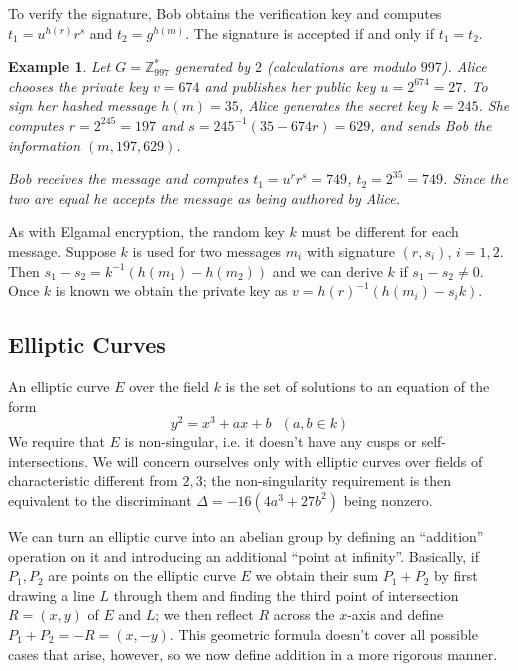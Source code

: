 \documentclass[a4paper,12pt]{article}
\newtheorem*{example}{Example}
\begin{document}
To verify the signature, Bob obtains the verification key and computes $t_1 = u^{h(r)} r^s$ and $t_2 = g^{h(m)}$. The signature is accepted if and only if $t_1 = t_2$. \cite[p. 458]{menezes}

\begin{example} %
Let $G = \mathbb{Z}_{997}^*$ generated by $2$ (calculations are modulo $997$). Alice chooses the private key $v = 674$ and publishes her public key $u = 2^{674} = 27$. To sign her hashed message $h(m) = 35$, Alice generates the secret key $k = 245$. She computes $r = 2^{245} = 197$ and $s = 245^{-1}(35-674r) = 629$, and sends Bob the information $(m,197,629)$.

Bob receives the message and computes $t_1 = u^r r^s = 749$, $t_2 = 2^{35} = 749$. Since the two are equal he accepts the message as being authored by Alice.
\end{example}

As with Elgamal encryption, the random key $k$ must be different for each message. Suppose $k$ is used for two messages $m_i$ with signature $(r,s_i)$, $i=1,2$. Then $s_1-s_2 = k^{-1}(h(m_1)-h(m_2))$ and we can derive $k$ if $s_1-s_2 \neq 0$. Once $k$ is known we obtain the private key as $v = h(r)^{-1}(h(m_i)-s_i k)$. \cite[p. 455]{menezes}

\subsection{Elliptic Curves}

An elliptic curve $E$ over the field $k$ is the set of solutions to an equation of the form $$y^2=x^3+ax+b\ \ \ (a,b \in k)$$
We require that $E$ is non-singular, i.e. it doesn't have any cusps or self-intersections. We will concern ourselves only with elliptic curves over fields of characteristic different from $2,3$; the non-singularity requirement is then equivalent to the discriminant $\Delta = -16(4a^3+27b^2)$ being nonzero. \cite[p. 45]{silverman}

We can turn an elliptic curve into an abelian group by defining an ``addition'' operation on it and introducing an additional ``point at infinity''. Basically, if $P_1,P_2$ are points on the elliptic curve $E$ we obtain their sum $P_1+P_2$ by first drawing a line $L$ through them and finding the third point of intersection $R=(x,y)$ of $E$ and $L$; we then reflect $R$ across the $x$-axis and define $P_1+P_2=-R=(x,-y)$. This geometric formula doesn't cover all possible cases that arise, however, so we now define addition in a more rigorous manner.
\end{document}
